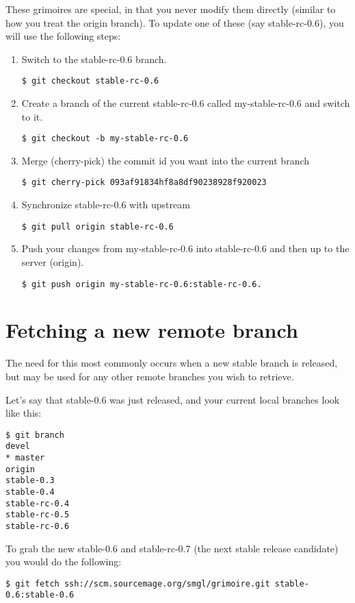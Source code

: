 \documentclass[a4paper,10pt]{book}
\begin{document}
These grimoires are special, in that you never modify them directly
(similar to how you treat the origin branch). To update one of these (say
stable-rc-0.6), you will use the following steps:
\begin{enumerate}
\item Switch to the stable-rc-0.6 branch.
\begin{verbatim}
$ git checkout stable-rc-0.6
\end{verbatim}
\item Create a branch of the current stable-rc-0.6 called my-stable-rc-0.6 and
switch to it.
\begin{verbatim}
$ git checkout -b my-stable-rc-0.6
\end{verbatim}
\item Merge (cherry-pick) the commit id you want into the current branch
\begin{verbatim}
$ git cherry-pick 093af91834hf8a8df90238928f920023
\end{verbatim}
\item Synchronize stable-rc-0.6 with upstream
\begin{verbatim}
$ git pull origin stable-rc-0.6
\end{verbatim}
\item Push your changes from my-stable-rc-0.6 into stable-rc-0.6 and then up to
the server (origin).
\begin{verbatim}
$ git push origin my-stable-rc-0.6:stable-rc-0.6.
\end{verbatim}
\end{enumerate}

\section{Fetching a new remote branch}
The need for this most commonly occurs when a new stable branch is released,
but may be used for any other remote branches you wish to retrieve.

Let's say that stable-0.6 was just released, and your current local branches
look like this:
\begin{verbatim}
$ git branch
devel
* master
origin
stable-0.3
stable-0.4
stable-rc-0.4
stable-rc-0.5
stable-rc-0.6
\end{verbatim}

To grab the new stable-0.6 and stable-rc-0.7 (the next stable release
candidate)
you would do the following:
\begin{verbatim}
$ git fetch ssh://scm.sourcemage.org/smgl/grimoire.git stable-0.6:stable-0.6
\end{verbatim}
\end{document}
